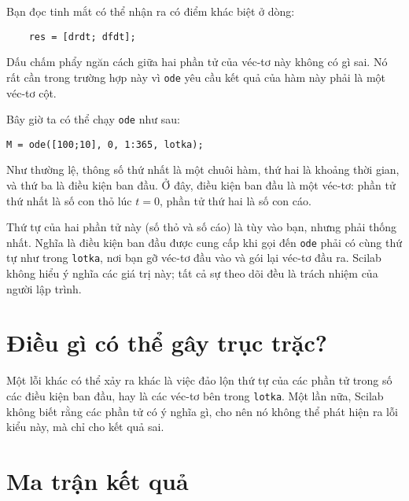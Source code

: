 \documentclass[12pt]{book}
\begin{document}
Bạn đọc tinh mắt có thể nhận ra có điểm khác biệt ở dòng:

\begin{verbatim}
    res = [drdt; dfdt];
\end{verbatim}

Dấu chấm phẩy ngăn cách giữa hai phần tử của véc-tơ này không có gì sai.
Nó rất cần trong trường hợp này vì {\tt ode} yêu cầu kết quả của hàm
này phải là một véc-tơ cột.

Bây giờ ta có thể chạy {\tt ode} như sau:

\begin{verbatim}
M = ode([100;10], 0, 1:365, lotka);
\end{verbatim}
%
Như thường lệ, thông số thứ nhất là một chuôi hàm, thứ hai là 
khoảng thời gian, và thứ ba là điều kiện ban đầu. Ở đây, điều kiện
ban đầu là một véc-tơ: phần tử thứ nhất là số con thỏ lúc 
$t=0$, phần tử thứ hai là số con cáo.

Thứ tự của hai phần tử này (số thỏ và số cáo) là tùy vào bạn, nhưng
phải thống nhất. Nghĩa là điều kiện ban đầu được cung cấp khi gọi
đến {\tt ode} phải có cùng thứ tự như trong {\tt lotka}, 
nơi bạn gỡ véc-tơ đầu vào và gói lại véc-tơ đầu ra. 
Scilab không hiểu ý nghĩa các giá trị này; tất cả sự theo dõi đều là
trách nhiệm của người lập trình.



\section{Điều gì có thể gây trục trặc?}

%
%

Một lỗi khác có thể xảy ra khác là việc đảo lộn thứ tự của các phần tử
trong số các điều kiện ban đầu, hay là các véc-tơ bên trong {\tt lotka}. 
Một lần nữa, Scilab không biết rằng các phần tử có ý nghĩa gì, cho
nên nó không thể phát hiện ra lỗi kiểu này, mà chỉ cho kết quả sai.



\section{Ma trận kết quả}
\end{document}
